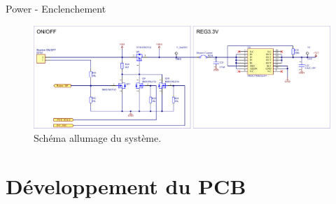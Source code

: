 \documentclass{beamer}
\begin{document}
\begin{frame}{Power - Enclenchement}
	\begin{figure}[h]
		\centering
		\includegraphics[width=1.07\linewidth]{../figures/etude/sch/ON-OFF}
		\caption{Schéma allumage du système.}
		\label{fig:on-off}
	\end{figure}
\end{frame}

\section{Développement du PCB}
\end{document}
